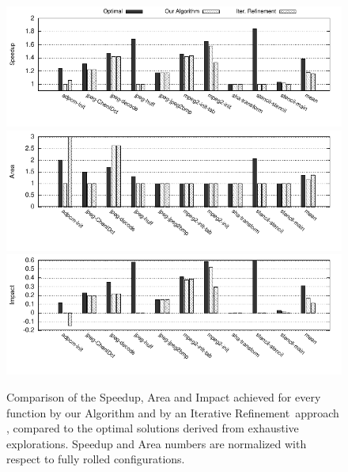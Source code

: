\documentclass[]{usiinfthesis}
\newcommand{\ItRef}{{Iterative Refinement}}
\begin{document}
%
%
\begin{figure}[h!]
\centering
\hspace*{-1cm}
\includegraphics[width=1.1\textwidth]{figs/iter_ref_abs_speed_c90.pdf}\\
\vspace{-1em}
\hspace*{-1cm}
\includegraphics[width=1.1\textwidth]{figs/iter_ref_abs_area_c90.pdf}\\
\vspace{-1em}
\hspace*{-1cm}
\includegraphics[width=1.1\textwidth]{figs/iter_ref_abs_impact_c90.pdf}
\vspace{-2em}
\caption{Comparison of the Speedup, Area and Impact achieved for every function by our 
Algorithm and by an \ItRef\ approach \cite{MarianiApr12} \cite{PalermoNov09}
\cite{XydisMar13} \cite{ZuluagaJun12}, compared to the optimal solutions derived from
exhaustive explorations. Speedup and Area numbers are normalized with respect to
fully rolled configurations.}
\vspace{2em}
\label{fig:speed_ir}
\end{figure}
\end{document}
